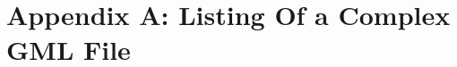 \section*{Appendix A: Listing Of a Complex GML File}
\label{sec:appendix_A}

\begin{center}
	
\end{center}